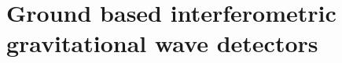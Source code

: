 \section{Ground based interferometric gravitational wave detectors}\label{sec:groundbased}

%







